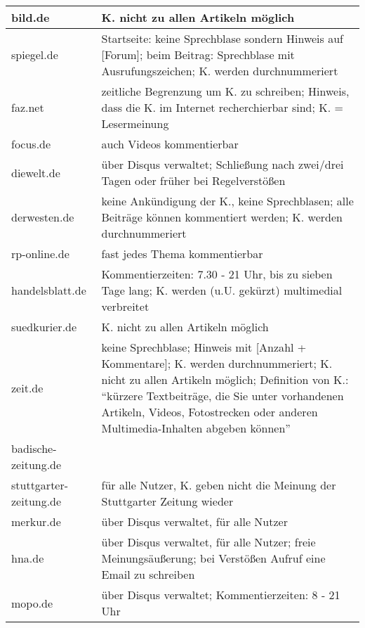 \begin{landscape}
\begin{longtable}{l|p{170mm}}
\hline
bild.de			& K. nicht zu allen Artikeln möglich \\\hline
spiegel.de		& Startseite: keine Sprechblase sondern Hinweis auf [Forum]; beim Beitrag: Sprechblase mit Ausrufungszeichen; K. werden durchnummeriert \\\hline
faz.net			& zeitliche Begrenzung um K. zu schreiben; Hinweis, dass die K. im Internet recherchierbar sind; K. = Lesermeinung \\\hline
focus.de		& auch Videos kommentierbar \\\hline
diewelt.de		& über Disqus verwaltet; Schließung nach zwei/drei Tagen oder früher bei Regelverstößen \\\hline
derwesten.de		& keine Ankündigung der K., keine Sprechblasen; alle Beiträge können kommentiert werden; K. werden durchnummeriert \\\hline
rp-online.de		& fast jedes Thema kommentierbar \\\hline
handelsblatt.de		& Kommentierzeiten: 7.30 - 21 Uhr, bis zu sieben Tage lang; K. werden (u.U. gekürzt) multimedial verbreitet \\\hline
suedkurier.de		& K. nicht zu allen Artikeln möglich \\\hline
zeit.de			& keine Sprechblase; Hinweis mit  [Anzahl + Kommentare]; K. werden durchnummeriert;  K. nicht zu allen Artikeln möglich; Definition von K.: ``kürzere Textbeiträge, die Sie unter vorhandenen Artikeln, Videos, Fotostrecken oder anderen Multimedia-Inhalten abgeben können'' \\\hline
badische-zeitung.de	& \\\hline
stuttgarter-zeitung.de	& für alle Nutzer, K. geben nicht die Meinung der Stuttgarter Zeitung wieder\\\hline
merkur.de			& über Disqus verwaltet, für alle Nutzer\\\hline
hna.de			& über Disqus verwaltet, für alle Nutzer; freie Meinungsäußerung; bei Verstößen Aufruf eine Email zu schreiben \\\hline
mopo.de			& über Disqus verwaltet; Kommentierzeiten: 8 - 21 Uhr\\\hline

\end{longtable}
\end{landscape}
